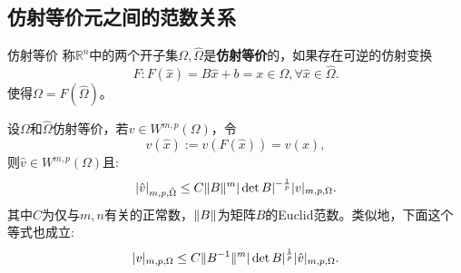 \subsection{仿射等价元之间的范数关系}
\begin{definition}{仿射等价}
    称$\mathbb{R}^{n}$中的两个开子集$\Omega,\hat{\Omega}$是\textbf{仿射等价}的，如果存在可逆的仿射变换
    \begin{equation}
        F:F(\hat{x})=B\hat{x}+b=x\in\Omega,\forall\hat{x}\in\hat{\Omega}.
    \end{equation}
    使得$\Omega=F(\hat{\Omega})$。
\end{definition}
\begin{theorem}
    设$\Omega$和$\hat{\Omega}$仿射等价，若$v\in W^{m,p}(\Omega)$，令
    \begin{equation}
        \hat{v}(\hat{x}):=v(F(\hat{x}))=v(x),
    \end{equation}
    则$\hat{v}\in W^{m,p}(\Omega)$且:
    \begin{equation}
        \label{eq:semiNormApprox1}
        |\hat{v}|_{m,p,\hat{\Omega}}\le C\|B\|^{m}|\det B|^{-\frac{1}{p}}|v|_{m,p,\Omega}.
    \end{equation}
    其中$C$为仅与$m,n$有关的正常数，$\|B\|$为矩阵$B$的Euclid范数。类似地，下面这个等式也成立:
    \begin{equation}
        \label{eq:semiNormApprox2}
        |v|_{m,p,\Omega}\le C\|B^{-1}\|^{m}|\det B|^{\frac{1}{p}}|\hat{v}|_{m,p,\Omega}.
    \end{equation}
\end{theorem}

